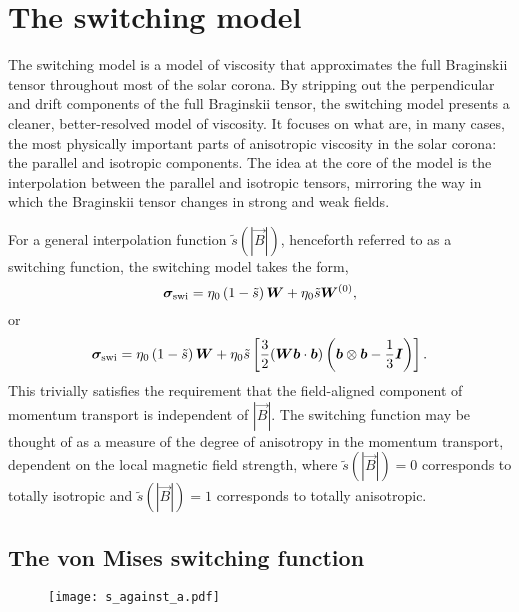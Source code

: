 \section{The switching model}

The switching model is a model of viscosity that approximates the full Braginskii tensor throughout most of the solar corona. By stripping out the perpendicular and drift components of the full Braginskii tensor, the switching model presents a cleaner, better-resolved model of viscosity. It focuses on what are, in many cases, the most physically important parts of anisotropic viscosity in the solar corona: the parallel and isotropic components. The idea at the core of the model is the interpolation between the parallel and isotropic tensors, mirroring the way in which the Braginskii tensor changes in strong and weak fields.

For a general interpolation function $\tilde{s}(|\vec{B}|)$, henceforth referred to as a switching function, the switching model takes the form,
\begin{equation}
  \label{eq:switching_model_simple}
{\bm \sigma}_{\text{swi}} = \eta_0 \left( 1 - \tilde{s} \right) {\bm W} + \eta_0 \tilde{s} {\bm W}^{(0)},
\end{equation}
or
\begin{equation}
  \label{eq:switching_model}
{\bm \sigma}_{\text{swi}} = \eta_0 \left( 1 - \tilde{s} \right) {\bm W} + \eta_0 \tilde{s} \left[\frac{3}{2}({\bm W}{\bm b}\cdot{\bm b}) \left( {\bm b} \otimes {\bm b} - \frac{1}{3}{\bm I} \right)\right].
\end{equation}
This trivially satisfies the requirement that the field-aligned component of momentum transport is independent of $|\vec{B}|$. The switching function may be thought of as a measure of the degree of anisotropy in the momentum transport, dependent on the local magnetic field strength, where $\tilde{s}(|\vec{B}|) = 0$ corresponds to totally isotropic and $\tilde{s}(|\vec{B}|) = 1$ corresponds to totally anisotropic.

\subsection{The von Mises switching function}

\label{sec:switching_function}

\begin{figure}[t]
  \centering
  \texttt{[image: s\_against\_a.pdf]}
  \label{fig:s_against_a}
\end{figure}

